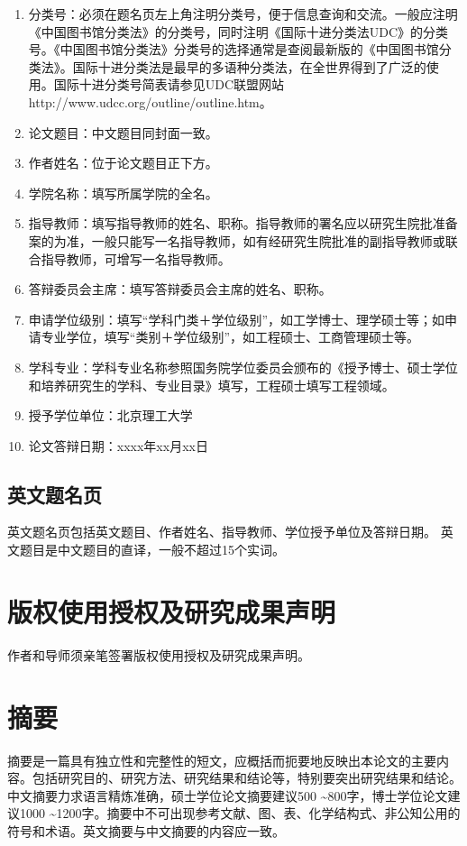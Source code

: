 \begin{enumerate}
\item 分类号：必须在题名页左上角注明分类号，便于信息查询和交流。一般应注明《中国图书馆分类法》的分类号，同时注明《国际十进分类法UDC》的分类号。《中国图书馆分类法》分类号的选择通常是查阅最新版的《中国图书馆分类法》。国际十进分类法是最早的多语种分类法，在全世界得到了广泛的使用。国际十进分类号简表请参见UDC联盟网站http://www.udcc.org/outline/outline.htm。
\item 论文题目：中文题目同封面一致。
\item 作者姓名：位于论文题目正下方。
\item 学院名称：填写所属学院的全名。
\item 指导教师：填写指导教师的姓名、职称。指导教师的署名应以研究生院批准备案的为准，一般只能写一名指导教师，如有经研究生院批准的副指导教师或联合指导教师，可增写一名指导教师。
\item 答辩委员会主席：填写答辩委员会主席的姓名、职称。
\item 申请学位级别：填写“学科门类＋学位级别”，如工学博士、理学硕士等；如申请专业学位，填写“类别＋学位级别”，如工程硕士、工商管理硕士等。
\item 学科专业：学科专业名称参照国务院学位委员会颁布的《授予博士、硕士学位和培养研究生的学科、专业目录》填写，工程硕士填写工程领域。
\item 授予学位单位：北京理工大学
\item 论文答辩日期：xxxx年xx月xx日
\end{enumerate}

\subsection{英文题名页}
英文题名页包括英文题目、作者姓名、指导教师、学位授予单位及答辩日期。
英文题目是中文题目的直译，一般不超过15个实词。

\section{版权使用授权及研究成果声明}
作者和导师须亲笔签署版权使用授权及研究成果声明。

\section{摘要}
摘要是一篇具有独立性和完整性的短文，应概括而扼要地反映出本论文的主要内容。包括研究目的、研究方法、研究结果和结论等，特别要突出研究结果和结论。中文摘要力求语言精炼准确，硕士学位论文摘要建议500 \sim 800字，博士学位论文建议1000 \sim 1200字。摘要中不可出现参考文献、图、表、化学结构式、非公知公用的符号和术语。英文摘要与中文摘要的内容应一致。


